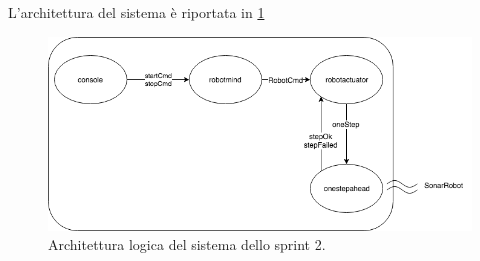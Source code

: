 L'architettura del sistema è riportata in \cref{fig:sprint2_logic}

\begin{figure} [H]
\includegraphics[width=\linewidth]{img/sprint2/sprint2_logic.png}
\caption{Architettura logica del sistema dello sprint 2.}
\label{fig:sprint2_logic}
\end{figure}



